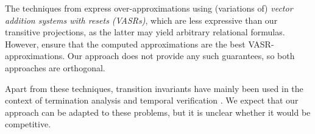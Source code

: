 The techniques from \cite{silverman19,kincaid24} express over-ap\-prox\-i\-ma\-tions using (variations of) \emph{vector addition systems with resets (VASRs)}, which are less expressive than our transitive projections, as the latter may yield arbitrary relational formulas.
%
However, \cite{silverman19,kincaid24} ensure that the computed ap\-prox\-i\-ma\-tions are the best VASR-ap\-prox\-i\-ma\-tions.
%
Our approach does not provide any such guarantees, so both approaches are orthogonal.

Apart from these techniques, transition invariants have mainly been used in the context of termination analysis and temporal verification \cite{tsitovich11,compositional_transition_invariants,heizmann10,podelski11,zuleger18}.
%
We expect that our approach can be adapted to these problems, but it is unclear whether it would be competitive.

